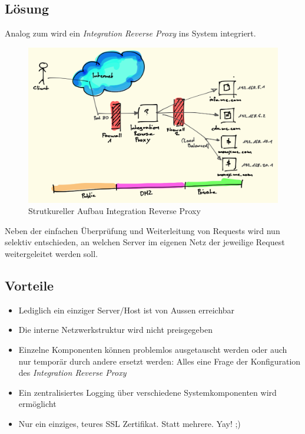 \newpage
\subsection*{Lösung}
Analog zum  wird ein \emph{Integration Reverse Proxy} ins System integriert.

\begin{figure}[H]
	\centering
	\includegraphics[width=12cm]{content/secure-internet-applications/images/integration-reverse-proxy.png}
	\caption{Strutkureller Aufbau Integration Reverse Proxy}
\end{figure}

Neben der einfachen Überprüfung und Weiterleitung von Requests wird nun selektiv entschieden, an welchen Server im eigenen Netz der jeweilige Request weitergeleitet werden soll.


\subsection*{Vorteile}
\begin{itemize}
	\item Lediglich ein einziger Server/Host ist von Aussen erreichbar
	\item Die interne Netzwerkstruktur wird nicht preisgegeben
	\item Einzelne Komponenten können problemlos ausgetauscht werden oder auch nur temporär durch andere ersetzt werden: Alles eine Frage der Konfiguration des \emph{Integration Reverse Proxy}
	\item Ein zentralisiertes Logging über verschiedene Systemkomponenten wird ermöglicht
	\item Nur ein einziges, teures SSL Zertifikat. Statt mehrere. Yay! ;)
\end{itemize}

